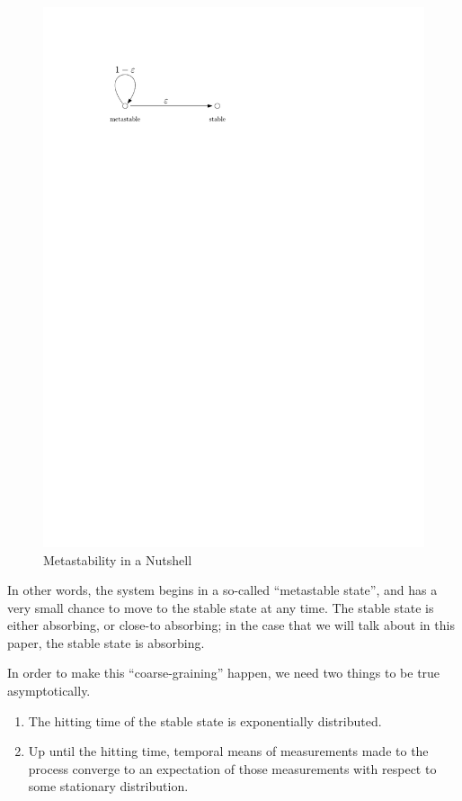 \documentclass{scrartcl}
\begin{document}
\begin{figure}[h!]
  \centering
  \includegraphics{presentation_owen/metastable_coarse_grain.pdf}
  \caption{Metastability in a Nutshell}
  \label{fig:metastability_nutshell}
\end{figure}

In other words, the system begins in a so-called ``metastable state'', and has a very small chance to move to the stable state at any time. The stable state is either absorbing, or close-to absorbing; in the case that we will talk about in this paper, the stable state is absorbing.

In order to make this ``coarse-graining'' happen, we need two things to be true asymptotically.

\begin{enumerate}
  \item The hitting time of the stable state is exponentially distributed.
  \item Up until the hitting time, temporal means of measurements made to the process converge to an expectation of those measurements with respect to some stationary distribution.
\end{enumerate}
\end{document}
